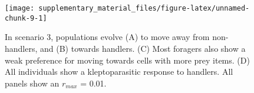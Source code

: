 \documentclass[
]{scrreprt}
\begin{document}
\begin{figure}

{\centering \texttt{[image: supplementary\_material\_files/figure-latex/unnamed-chunk-9-1]} 

}

\caption{In scenario 3, populations evolve (A) to move away from non-handlers, and (B) towards handlers. (C) Most foragers also show a weak preference for moving towards cells with more prey items. (D) All individuals show a kleptoparasitic response to handlers. All panels show an $r_{max}$ = 0.01.}\label{fig:unnamed-chunk-9}
\end{figure}
\end{document}
